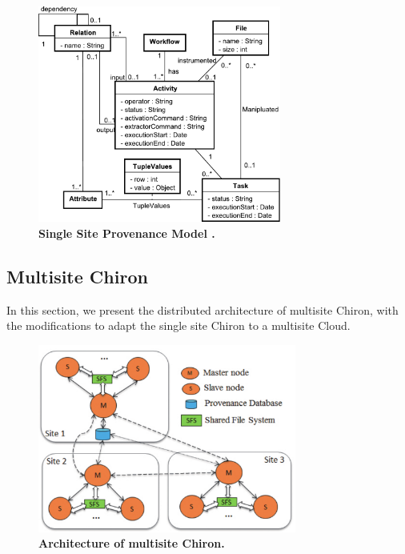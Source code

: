 \begin{figure}
\begin{centering}
\captionsetup{justification=centering}
\includegraphics[width=80mm]{figures/SProv}
\par\end{centering}
\caption{\textbf{Single Site Provenance Model \cite{Ogasawara2013}. }}
\label{fig:SProv}
\end{figure}
 
\subsection{Multisite Chiron}
\label{subsec:MSA}

In this section, we present the distributed architecture of multisite Chiron, with the modifications to adapt the single site Chiron to a multisite Cloud.

\begin{figure}
\begin{centering}
\captionsetup{justification=centering}
\includegraphics[width=85mm]{figures/MEE}
\par\end{centering}
\caption{\textbf{Architecture of multisite Chiron. }}
\label{fig:MEE}
\end{figure}

